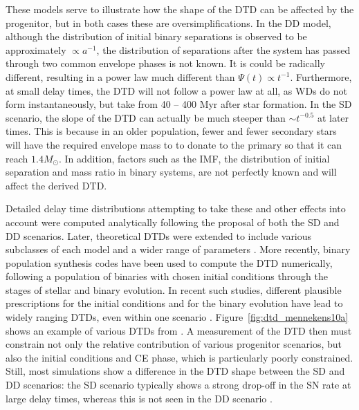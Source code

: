 These models serve to illustrate how the shape of the DTD can be
affected by the progenitor, but in both cases these are
oversimplifications. In the DD model, although the distribution of
initial binary separations is observed to be approximately $\propto
a^{-1}$, the distribution of separations after the system has passed
through two common envelope \citep[CE; see, e.g.,][]{yungelson05a}
phases is not known. It is could be radically different, resulting in
a power law much different than  $\Psi (t) \propto t^{-1}$. Furthermore, at small delay
times, the DTD will not follow a power law at all, as WDs do not form
instantaneously, but take from 40 -- 400 Myr after star formation.  In
the SD scenario, the slope of the DTD can actually be much steeper
than $\sim$$t^{-0.5}$ at later times. This is because in an older
population, fewer and fewer secondary stars will have the required
envelope mass to to donate to the primary so that it can reach $1.4
M_\odot$. In addition, factors such as the IMF, the distribution of
initial separation and mass ratio in binary systems, are not perfectly
known and will affect the derived DTD.

Detailed delay time distributions attempting to take these and other
effects into account were computed analytically following the proposal
of both the SD \citep{greggio83a} and DD
\citep{tornambe86a,tornambe89a} scenarios. Later, theoretical DTDs
were extended to include various subclasses of each model and a wider
range of parameters \citep{tutukov94a,
  yungelson00a,matteucci01a,belczynski05a,greggio05a}. More recently,
binary population synthesis codes have been used to compute the DTD
numerically, following a population of binaries with chosen initial
conditions through the stages of stellar and binary evolution. In
recent such studies, different plausible prescriptions for the initial
conditions and for the binary evolution have lead to widely ranging
DTDs, even within one scenario
\citep{hachisu08a,kobayashi09a,ruiter09a,mennekens10a}. Figure~\ref{fig:dtd_mennekens10a}
shows an example of various DTDs from \citet{mennekens10a}. A
measurement of the DTD then must constrain not only the relative
contribution of various progenitor scenarios, but also the initial
conditions and CE phase, which is particularly poorly
constrained. Still, most simulations show a difference in the DTD
shape between the SD and DD scenarios: the SD scenario typically shows
a strong drop-off in the SN rate at large delay times, whereas this is
not seen in the DD scenario \citep[but see][]{hachisu08a}.

